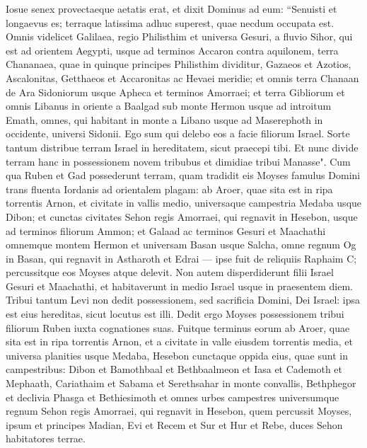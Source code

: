 \begin{biblechapter}  
\verse Iosue senex provectaeque aetatis erat, et dixit Dominus ad eum: “Senuisti et longaevus es; terraque latissima adhuc superest, quae necdum occupata est. 
\verse Omnis videlicet Galilaea, regio Philisthim et universa Gesuri, 
\verse a fluvio Sihor, qui est ad orientem Aegypti, usque ad terminos Accaron contra aquilonem, terra Chananaea, quae in quinque principes Philisthim dividitur, Gazaeos et Azotios, Ascalonitas, Getthaeos et Accaronitas ac Hevaei  
\verse meridie; et omnis terra Chanaan de Ara Sidoniorum usque Apheca et terminos Amorraei; 
\verse et terra Gibliorum et omnis Libanus in oriente a Baalgad sub monte Hermon usque ad introitum Emath, 
\verse omnes, qui habitant in monte a Libano usque ad Maserephoth in occidente, universi Sidonii. Ego sum qui delebo eos a facie filiorum Israel. Sorte tantum distribue terram Israel in hereditatem, sicut praecepi tibi. 
\verse Et nunc divide terram hanc in possessionem novem tribubus et dimidiae tribui Manasse". 
\verse Cum qua Ruben et Gad possederunt terram, quam tradidit eis Moyses famulus Domini trans fluenta Iordanis ad orientalem plagam: 
\verse ab Aroer, quae sita est in ripa torrentis Arnon, et civitate in vallis medio, universaque campestria Medaba usque Dibon; 
\verse et cunctas civitates Sehon regis Amorraei, qui regnavit in Hesebon, usque ad terminos filiorum Ammon; 
\verse et Galaad ac terminos Gesuri et Maachathi omnemque montem Hermon et universam Basan usque Salcha, 
\verse omne regnum Og in Basan, qui regnavit in Astharoth et Edrai — ipse fuit de reliquiis Raphaim C; percussitque eos Moyses atque delevit. 
\verse Non autem disperdiderunt filii Israel Gesuri et Maachathi, et habitaverunt in medio Israel usque in praesentem diem. 
\verse Tribui tantum Levi non dedit possessionem, sed sacrificia Domini, Dei Israel: ipsa est eius hereditas, sicut locutus est illi. 
\verse Dedit ergo Moyses possessionem tribui filiorum Ruben iuxta cognationes suas. 
\verse Fuitque terminus eorum ab Aroer, quae sita est in ripa torrentis Arnon, et a civitate in valle eiusdem torrentis media, et universa planities usque Medaba, 
\verse Hesebon cunctaque oppida eius, quae sunt in campestribus: Dibon et Bamothbaal et Bethbaalmeon 
\verse et Iasa et Cademoth et Mephaath, 
\verse Cariathaim et Sabama et Serethsahar in monte convallis, 
\verse Bethphegor et declivia Phasga et Bethiesimoth 
\verse et omnes urbes campestres universumque regnum Sehon regis Amorraei, qui regnavit in Hesebon, quem percussit Moyses, ipsum et principes Madian, Evi et Recem et Sur et Hur et Rebe, duces Sehon habitatores terrae. 

\end{biblechapter}
